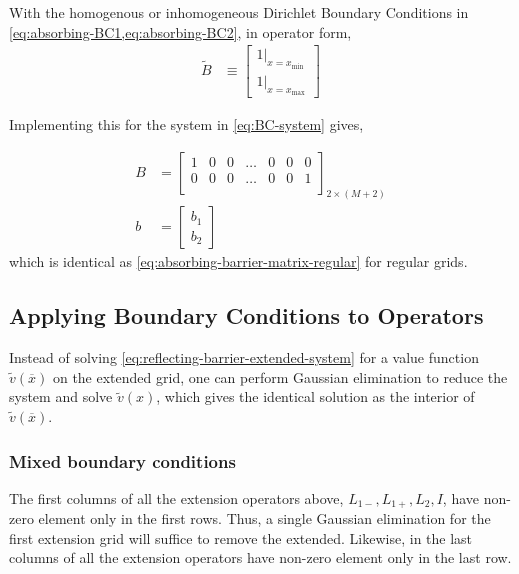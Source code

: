 \documentclass[11pt]{article}
\theoremstyle{definition}
\begin{document}
With the homogenous or inhomogeneous Dirichlet Boundary Conditions in \cref{eq:absorbing-BC1,eq:absorbing-BC2}, in operator form,
\begin{align}
\tilde{B} &\equiv \begin{bmatrix}
1 \vert_{x = x_{\min}}\\
1 \vert_{x = x_{\max}}
\end{bmatrix}
\end{align}

Implementing this for the system in \cref{eq:BC-system} gives,

\begin{align}
B &= \begin{bmatrix}
1 & 0 & 0 & \dots & 0 & 0 & 0 \\
0 & 0 & 0 & \dots & 0 & 0 & 1\\
\end{bmatrix}_{2 \times (M+2)}\\
b &= \begin{bmatrix}
b_1 \\
b_2
\end{bmatrix}
\end{align}
which is identical as \eqref{eq:absorbing-barrier-matrix-regular} for regular grids.

\subsection{Applying Boundary Conditions to Operators}
Instead of solving \eqref{eq:reflecting-barrier-extended-system} for a value function $\tilde{v}(\overline{x})$ on the extended grid, one can perform Gaussian elimination to reduce the system and solve $\tilde{v}(x)$, which gives the identical solution as the interior of $\tilde{v}(\overline{x})$.



\subsubsection{Mixed boundary conditions}\label{subsubsec-irregular-grids-mixed-boundary-conditions}

The first columns of all the extension operators above, ${L}_{1-}, {L}_{1+}, {L}_{2}, {I}$, have non-zero element only in the first rows. Thus, a single Gaussian elimination for the first extension grid will suffice to remove the extended. Likewise, in the last columns of all the extension operators have non-zero element only in the last row.
\end{document}
